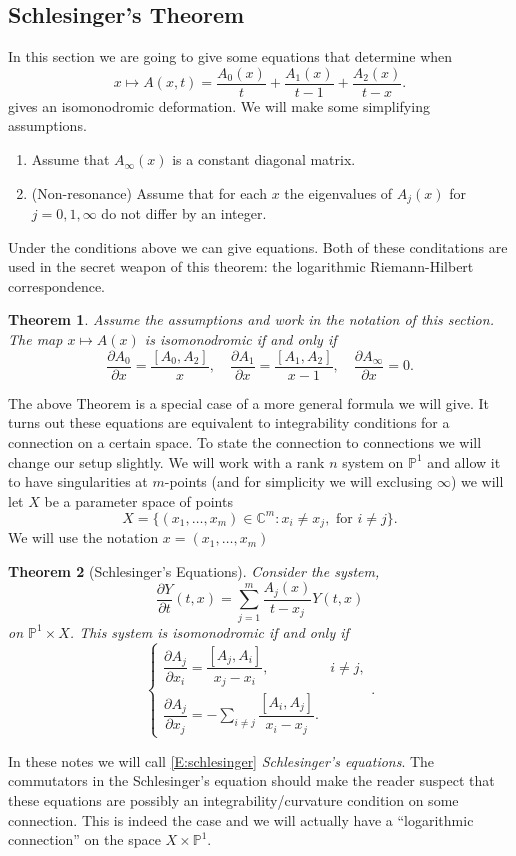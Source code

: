 \documentclass[12pt]{book}
\numberwithin{equation}{section}
\newtheorem{theorem}{Theorem}[subsection]
\theoremstyle{definition}
\theoremstyle{remark}
\newcommand{\CC}{\mathbb{C}}
\newcommand{\PP}{\mathbb{P}}
\begin{document}
\subsection{Schlesinger's Theorem}
In this section we are going to give some equations that determine when 
\begin{equation}
x\mapsto A(x,t) = \dfrac{A_0(x)}{t} +\dfrac{A_1(x)}{t-1} + \dfrac{A_2(x)}{t-x}.
\end{equation}
gives an isomonodromic deformation.
We will make some simplifying assumptions. 
\begin{enumerate}
	\item Assume that $A_{\infty}(x)$ is a constant diagonal matrix.
	\item (Non-resonance) Assume that for each $x$ the eigenvalues of $A_j(x)$ for $j=0,1,\infty$ do not differ by an integer. 
\end{enumerate}
Under the conditions above we can give equations.
Both of these conditations are used in the secret weapon of this theorem: the logarithmic Riemann-Hilbert correspondence. 
\begin{theorem}
	Assume the assumptions and work in the notation of this section.
	The map $x\mapsto A(x)$ is isomonodromic if and only if 
	$$\dfrac{\partial A_0}{\partial x} = \dfrac{[A_0,A_2]}{x}, \quad \dfrac{\partial A_1}{\partial x} = \dfrac{[A_1,A_2]}{x-1}, \quad \dfrac{\partial A_{\infty}}{\partial x}=0.$$
\end{theorem}
The above Theorem is a special case of a more general formula we will give. 
It turns out these equations are equivalent to integrability conditions for a connection on a certain space. 
To state the connection to connections we will change our setup slightly. 
We will work with a rank $n$ system on $\PP^1$ and allow it to have singularities at $m$-points (and for simplicity we will exclusing $\infty$) we will let $X$ be a parameter space of points
 $$ X = \lbrace (x_1,\ldots, x_m) \in \CC^m \colon x_i \neq x_j, \mbox{ for } i\neq j \rbrace .$$
We will use the notation $x=(x_1,\ldots,x_m)$
\begin{theorem}[Schlesinger's Equations]
	Consider the system, 
	 $$ \dfrac{\partial Y}{
	 \partial t}(t,x) = \sum_{j=1}^m \dfrac{A_j(x)}{t-x_j} Y(t,x)$$
 	on $\PP^1\times X$.
 	This system is isomonodromic if and only if 
 	\begin{equation}\label{E:schlesinger}
 	\begin{cases}
 	 \dfrac{\partial A_j}{\partial x_i} = \dfrac{[A_j,A_i]}{x_j-x_i}, &  i \neq j,\\ 
 	  \dfrac{\partial A_j}{\partial x_j} = -\sum_{i\neq j}\dfrac{[A_i,A_j]}{x_i-x_j}.
 	  \end{cases}.
 	 \end{equation}
\end{theorem}
In these notes we will call \eqref{E:schlesinger} \emph{Schlesinger's equations}.
The commutators in the Schlesinger's equation should make the reader suspect that these equations are possibly an integrability/curvature condition on some connection. 
This is indeed the case and we will actually have a ``logarithmic connection'' on the space $X\times \PP^1$.
\end{document}
